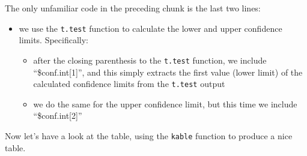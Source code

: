 \documentclass[
]{book}
\newenvironment{Shaded}{\begin{snugshade}}{\end{snugshade}}
\newcommand{\AttributeTok}[1]{\textcolor[rgb]{0.13,0.29,0.53}{#1}}
\newcommand{\ConstantTok}[1]{\textcolor[rgb]{0.56,0.35,0.01}{#1}}
\newcommand{\DecValTok}[1]{\textcolor[rgb]{0.00,0.00,0.81}{#1}}
\newcommand{\FloatTok}[1]{\textcolor[rgb]{0.00,0.00,0.81}{#1}}
\newcommand{\FunctionTok}[1]{\textcolor[rgb]{0.13,0.29,0.53}{\textbf{#1}}}
\newcommand{\NormalTok}[1]{#1}
\newcommand{\OtherTok}[1]{\textcolor[rgb]{0.56,0.35,0.01}{#1}}
\newcommand{\SpecialCharTok}[1]{\textcolor[rgb]{0.81,0.36,0.00}{\textbf{#1}}}
\providecommand{\tightlist}{%
  \setlength{\itemsep}{0pt}\setlength{\parskip}{0pt}}
\begin{document}
\begin{Shaded}
\end{Shaded}

The only unfamiliar code in the preceding chunk is the last two lines:

\begin{itemize}
\tightlist
\item
  we use the \texttt{t.test} function to calculate the lower and upper confidence limits. Specifically:

  \begin{itemize}
  \tightlist
  \item
    after the closing parenthesis to the \texttt{t.test} function, we include ``\$conf.int{[}1{]}'', and this simply extracts the first value (lower limit) of the calculated confidence limits from the \texttt{t.test} output
  \item
    we do the same for the upper confidence limit, but this time we include ``\$conf.int{[}2{]}''
  \end{itemize}
\end{itemize}

Now let's have a look at the table, using the \texttt{kable} function to produce a nice table.
\end{document}
